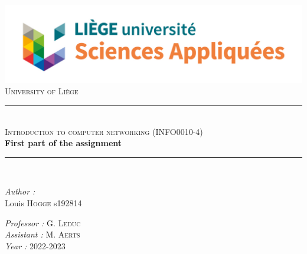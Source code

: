 \documentclass[a4paper, 11pt]{article}
\newcommand{\HRule}{\rule{\linewidth}{0.5mm}}
\begin{document}
\begin{titlepage}

\begin{center}
\includegraphics[scale = 0.35]{logo.jpg}\\
\vspace{1cm}
\textsc{\huge University of Liège}\\[1.2cm]
\HRule \\[1cm]
\textsc{\LARGE Introduction to computer networking (INFO0010-4) }\\[1cm]
{\Huge \bfseries First part of the assignment}\\[1.4cm] 
\HRule \\[1cm]
\end{center}

\begin{minipage}{0.45\linewidth}
      \begin{flushleft} \large
        \emph{Author : } \\
        Louis \textsc{Hogge}  s192814
      \end{flushleft}
\end{minipage}
\hfill
\begin{minipage}{0.45\linewidth}
      \begin{flushright} \large
        \emph{Professor : } G. \textsc{Leduc}\\
        \emph{Assistant : } M. \textsc{Aerts}\\
        \emph{Year : } 2022-2023 
      \end{flushright}
\end{minipage}

\end{titlepage}

\newpage
\end{document}
